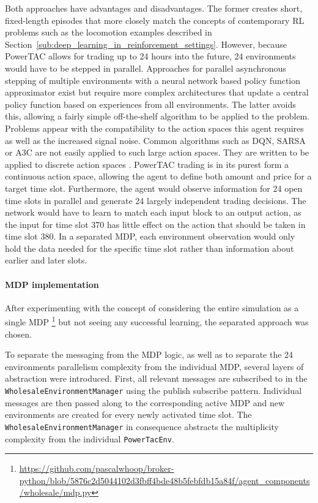 Both approaches have advantages and disadvantages. The former creates short, fixed-length episodes that more closely
match the concepts of contemporary \ac{RL} problems such as the locomotion examples described in
Section~\ref{sub:deep_learning_in_reinforcement_settings}. However, because \ac{PowerTAC} allows for trading up to 24 hours into the future, 24
environments would have to be stepped in parallel. Approaches for parallel asynchronous stepping of multiple
environments with a neural network based policy function approximator exist \cite{mnih2016asynchronous,hafner2017agents}
but require more complex architectures that update a central policy function based on experiences from all environments.
The latter avoids this, allowing a fairly simple off-the-shelf algorithm to be applied to the problem. Problems appear
with the compatibility to the action spaces this agent requires as well as the increased signal noise. Common algorithms
such as \ac{DQN}, \ac{SARSA} or \ac{A3C} are not easily applied to such large action spaces. They are written to be
applied to discrete action spaces \cite[]{baselines}. \ac{PowerTAC} trading is in its purest form a continuous action
space, allowing the agent to define both amount and price for a target time slot. Furthermore, the agent would observe
information for 24 open time slots in parallel and generate 24 largely independent trading decisions. The network would
have to learn to match each input block to an output action, as the input for time slot 370 has little effect on the
action that should be taken in time slot 380. In a separated \ac{MDP}, each environment observation would only hold the
data needed for the specific time slot rather than information about earlier and later slots.

\paragraph{\ac{MDP} implementation}%
\label{sub:mdp_design_and_implementation}

After experimenting with the concept of considering the entire simulation as a single \ac{MDP}
\footnote{\url{https://github.com/pascalwhoop/broker-python/blob/5876c2d5044102d3fbff4bde48b5febfdb15a84f/agent_components/wholesale/mdp.py}}
but not seeing any successful learning, the separated approach was chosen.

To separate the messaging from the \ac{MDP} logic, as well as to separate the 24 environments parallelism complexity
from the individual \ac{MDP}, several layers of abstraction were introduced. First, all relevant messages are
subscribed to in the \texttt{WholesaleEnvironmentManager} using the publish subscribe pattern. Individual messages are
then passed along to the corresponding active \ac{MDP} and new environments are created for every newly activated
time slot. The \texttt{WholesaleEnvironmentManager} in consequence abstracts the multiplicity complexity from the individual
\texttt{PowerTacEnv}.

